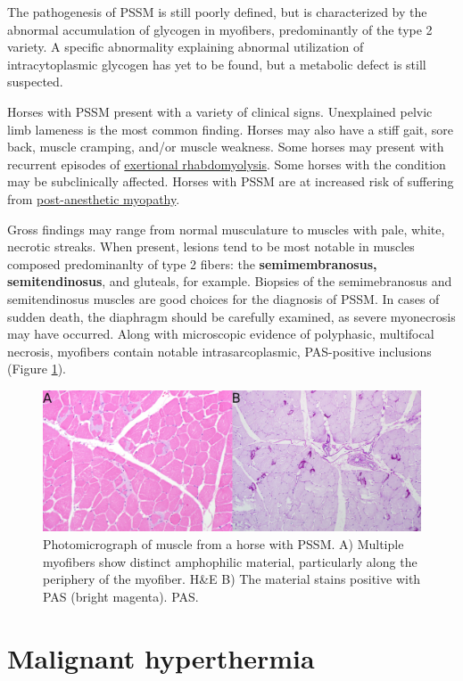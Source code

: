 \documentclass[openany]{book}
\begin{document}
The pathogenesis of PSSM is still poorly defined, but is characterized
by the abnormal accumulation of glycogen in myofibers, predominantly of
the type 2 variety. A specific abnormality explaining abnormal
utilization of intracytoplasmic glycogen has yet to be found, but a
metabolic defect is still suspected.

Horses with PSSM present with a variety of clinical signs. Unexplained
pelvic limb lameness is the most common finding. Horses may also have a
stiff gait, sore back, muscle cramping, and/or muscle weakness. Some
horses may present with recurrent episodes of
\protect\hyperlink{equine-exertional-rhabdomyolysis}{exertional
rhabdomyolysis}. Some horses with the condition may be subclinically
affected. Horses with PSSM are at increased risk of suffering from
\protect\hyperlink{postanesthetic-myopathy-of-horses}{post-anesthetic
myopathy}.

Gross findings may range from normal musculature to muscles with pale,
white, necrotic streaks. When present, lesions tend to be most notable
in muscles composed predominanlty of type 2 fibers: the
\textbf{semimembranosus, semitendinosus}, and gluteals, for example.
Biopsies of the semimebranosus and semitendinosus muscles are good
choices for the diagnosis of PSSM. In cases of sudden death, the
diaphragm should be carefully examined, as severe myonecrosis may have
occurred. Along with microscopic evidence of polyphasic, multifocal
necrosis, myofibers contain notable intrasarcoplasmic, PAS-positive
inclusions (Figure \ref{fig:PSSM}).

\begin{figure}
\centering
\includegraphics{images/PSSM.jpg}
\caption{\label{fig:PSSM}Photomicrograph of muscle from a horse with PSSM.
A) Multiple myofibers show distinct amphophilic material, particularly
along the periphery of the myofiber. H\&E B) The material stains
positive with PAS (bright magenta). PAS.}
\end{figure}

\section{Malignant hyperthermia}\label{malignant-hyperthermia}
\end{document}
